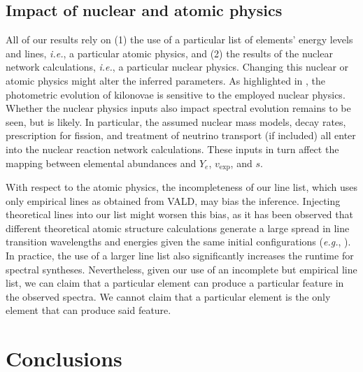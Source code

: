 \documentclass[twocolumn,twocolappendix]{aastex63}
\def\eg{{\it e.g.}}
\def\ie{{\it i.e.}}
\begin{document}
{{{{{{{{%
\subsection{Impact of nuclear and atomic physics}\label{ssc:nuclearatomic}

All of our results rely on (1) the use of a particular list of elements' energy levels and lines, \ie, a particular atomic physics, and (2) the results of the \cite{wanajo18} nuclear network calculations, \ie, a particular nuclear physics. Changing this nuclear or atomic physics might alter the inferred parameters. As highlighted in \cite{barnes21}, the photometric evolution of kilonovae is sensitive to the employed nuclear physics. Whether the nuclear physics inputs also impact spectral evolution remains to be seen, but is likely. In particular, the assumed nuclear mass models, decay rates, prescription for fission, and treatment of neutrino transport (if included) all enter into the nuclear reaction network calculations. These inputs in turn affect the mapping between elemental abundances and $Y_e$, $v_{\mathrm{exp}}$, and $s$. 

With respect to the atomic physics, the incompleteness of our line list, which uses only empirical lines as obtained from VALD, may bias the inference. Injecting theoretical lines into our list might worsen this bias, as it has been observed that different theoretical atomic structure calculations generate a large spread in line transition wavelengths and energies given the same initial configurations (\eg, \citealt{tanaka20, flors23}). In practice, the use of a larger line list also significantly increases the runtime for spectral syntheses. Nevertheless, given our use of an incomplete but empirical line list, we can claim that a particular element can produce a particular feature in the observed spectra. We cannot claim that a particular element is the only element that can produce said feature.










\section{Conclusions}\label{sec:conco}

}}}}}}}}
\end{document}
